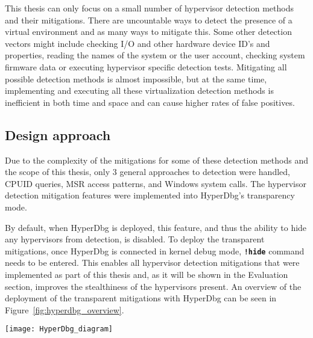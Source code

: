 This thesis can only focus on a small number of hypervisor detection methods and their mitigations. There are uncountable ways to detect the presence of a virtual environment and as many ways to mitigate this.
Some other detection vectors might include checking I/O and other hardware device ID's and properties, reading the names of the system or the user account, checking system firmware data or executing hypervisor specific detection tests.
Mitigating all possible detection methods is almost impossible, but at the same time, implementing and executing all these virtualization detection methods is inefficient in both time and space and can cause higher rates of false positives.


\subsection{Design approach}\label{design_approach}
Due to the complexity of the mitigations for some of these detection methods and the scope of this thesis, only 3 general approaches to detection were handled, CPUID queries, MSR access patterns, and Windows system calls. 
The hypervisor detection mitigation features were implemented into HyperDbg's transparency mode. 

By default, when HyperDbg is deployed, this feature, and thus the ability to hide any hypervisors from detection, is disabled. To deploy the transparent mitigations, 
once HyperDbg is connected in kernel debug mode, \textbf{\texttt{!hide}} command needs to be entered. This enables all hypervisor detection mitigations that were implemented as part of this thesis and, 
as it will be shown in the Evaluation section, improves the stealthiness of the hypervisors present. An overview of the deployment of the transparent mitigations with HyperDbg can be seen in Figure~\ref{fig:hyperdbg_overview}.

\begin{figure*}[t]
    \texttt{[image: HyperDbg\_diagram]} %
    \label{fig:hyperdbg_overview}
\end{figure*}


